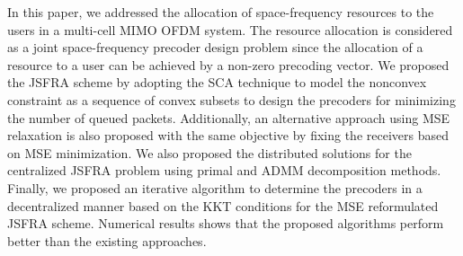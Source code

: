 
In this paper, we addressed the allocation of space-frequency resources to the users in a multi-cell \acl{MIMO} \acl{OFDM} system. The resource allocation is considered as a joint space-frequency precoder design problem since the allocation of a resource to a user can be achieved by a non-zero precoding vector. We proposed the \ac{JSFRA} scheme by adopting the \ac{SCA} technique to model the nonconvex constraint as a sequence of convex subsets to design the precoders for minimizing the number of queued packets. Additionally, an alternative approach using \acl{MSE} relaxation is also proposed with the same objective by fixing the receivers based on \ac{MSE} minimization. We also proposed the distributed solutions for the centralized \ac{JSFRA} problem using primal and \ac{ADMM} decomposition methods. Finally, we proposed an iterative algorithm to determine the precoders in a decentralized manner based on the \ac{KKT} conditions for the \ac{MSE} reformulated \ac{JSFRA} scheme. Numerical results shows that the proposed algorithms perform better than the existing approaches.